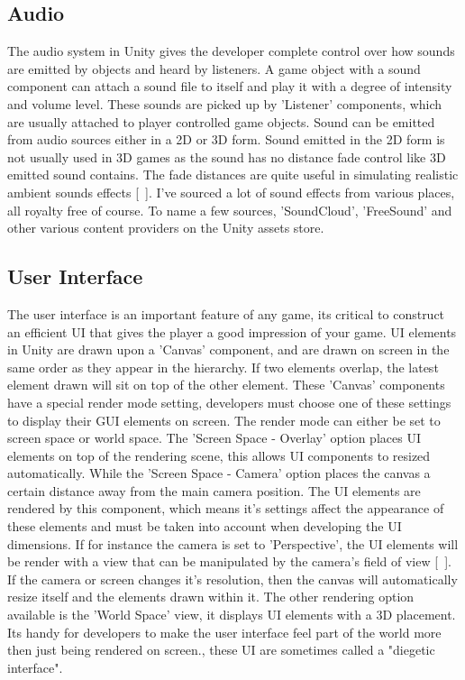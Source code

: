 \subsection{Audio}
The audio system in Unity gives the developer complete control over how sounds are emitted by objects and heard by listeners. A game object with a sound component can attach a sound file to itself and play it with a degree of intensity and volume level. These sounds are picked up by 'Listener' components, which are usually attached to player controlled game objects. Sound can be emitted from audio sources either in a 2D or 3D form. Sound emitted in the 2D form is not usually used in 3D games as the sound has no distance fade control like 3D emitted sound contains. The fade distances are quite useful in simulating realistic ambient sounds effects [~\cite{Audio-System}].
I’ve sourced a lot of sound effects from various places, all royalty free of course. To name a few sources, 'SoundCloud', 'FreeSound' and other various content providers on the Unity assets store.
\subsection{User Interface}
The user interface is an important feature of any game, its critical to construct an efficient UI that gives the player a good impression of your game. UI elements in Unity are drawn upon a 'Canvas' component, and are drawn on screen in the same order as they appear in the hierarchy. If two elements overlap, the latest element drawn will sit on top of the other element. These 'Canvas' components have a special render mode setting, developers must choose one of these settings to display their GUI elements on screen. The render mode can either be set to screen space or world space. The 'Screen Space - Overlay' option places UI elements on top of the rendering scene, this allows UI components to resized automatically. While the 'Screen Space - Camera' option places the canvas a certain distance away from the main camera position. The UI elements are rendered by this component, which means it's settings affect the appearance of these elements and must be taken into account when developing the UI dimensions. If for instance the camera is set to 'Perspective', the UI elements will be render with a view that can be manipulated by the camera's field of view [~\cite{UI-System}]. If the camera or screen changes it's resolution, then the canvas will automatically resize itself and the elements drawn within it. The other rendering option available is the 'World Space' view, it displays UI elements with a 3D placement. Its handy for developers to make the user interface feel part of the world more then just being rendered on screen., these UI are sometimes called a "diegetic interface". 
